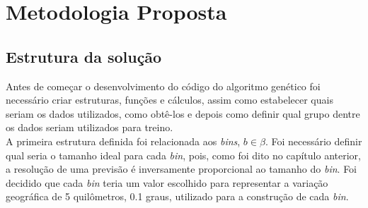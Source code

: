\chapter{Metodologia Proposta}\label{chapter6}
\section{Estrutura da solução}
Antes de começar o desenvolvimento do código do algoritmo genético foi necessário criar estruturas, funções e cálculos, assim como estabelecer quais seriam os dados utilizados, como obtê-los e depois como definir qual grupo dentre os dados seriam utilizados para treino.\\

A primeira estrutura definida foi relacionada aos {\it bins}, $b \in \beta$. Foi necessário definir qual seria o tamanho ideal para cada {\it bin}, pois, como foi dito no capítulo anterior, a resolução de uma previsão é inversamente proporcional ao tamanho do {\it bin}. Foi decidido que cada {\it bin} teria um valor escolhido para representar a variação geográfica de 5 quilômetros, 0.1 graus, utilizado para a construção de cada {\it bin}.\\


